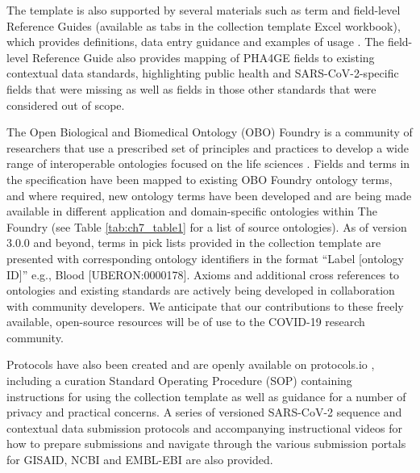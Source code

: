 The template is also supported by several materials such as term and field-level Reference Guides (available as tabs in the collection template Excel workbook), which provides definitions, data entry guidance and examples of usage \cite{public_health_alliance_for_genomic_epidemiology_sars-cov-2-contextual-data-specification_nodate}. The field-level Reference Guide also provides mapping of PHA4GE fields to existing contextual data standards, highlighting public health and SARS-CoV-2-specific fields that were missing as well as fields in those other standards that were considered out of scope. 

The Open Biological and Biomedical Ontology (OBO) Foundry is a community of researchers that use a prescribed set of principles and practices to develop a wide range of interoperable ontologies focused on the life sciences \cite{the_obo_foundry_obo_nodate}. Fields and terms in the specification have been mapped to existing OBO Foundry ontology terms, and where required, new ontology terms have been developed and are being made available in different application and domain-specific ontologies within The Foundry (see Table \ref{tab:ch7_table1} for a list of source ontologies). As of version 3.0.0 and beyond, terms in pick lists provided in the collection template are presented with corresponding ontology identifiers in the format “Label [ontology ID]” e.g., Blood [UBERON:0000178]. Axioms and additional cross references to ontologies and existing standards are actively being developed in collaboration with community developers. We anticipate that our contributions to these freely available, open-source resources will be of use to the COVID-19 research community.



Protocols have also been created and are openly available on protocols.io \cite{public_health_alliance_for_genomic_epidemiology_pha4ge_nodate}, including a curation Standard Operating Procedure (SOP) containing instructions for using the collection template as well as guidance for a number of privacy and practical concerns. A series of versioned SARS-CoV-2 sequence and contextual data submission protocols and accompanying instructional videos for how to prepare submissions and navigate through the various submission portals for GISAID, NCBI and EMBL-EBI are also provided.

